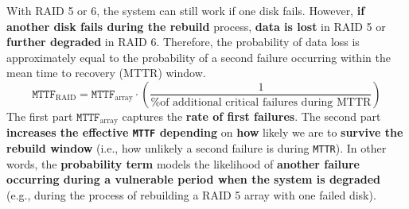 \begin{itemize}
    With RAID 5 or 6, the system can still work if one disk fails. However, \textbf{if another disk fails during the rebuild} process, \textbf{data is lost} in RAID 5 or \textbf{further degraded} in RAID 6. Therefore, the probability of data loss is approximately equal to the probability of a second failure occurring within the mean time to recovery (MTTR) window.
    \begin{equation}\label{eq: Mean Time To Failure of a RAID}
        \texttt{MTTF}_{\text{RAID}} = \texttt{MTTF}_{\text{array}} \cdot \left( \frac{1}{\text{\% of additional critical failures during MTTR}} \right)
    \end{equation}
    The first part $\texttt{MTTF}_{\text{array}}$ captures the \textbf{rate of first failures}. The second part \textbf{increases the effective \texttt{MTTF} depending} on \textbf{how} likely we are to \textbf{survive the rebuild window} (i.e., how unlikely a second failure is during \texttt{MTTR}). In other words, the \textbf{probability term} models the likelihood of \textbf{another failure occurring during a vulnerable period when the system is degraded} (e.g., during the process of rebuilding a RAID 5 array with one failed disk).


\end{itemize}
